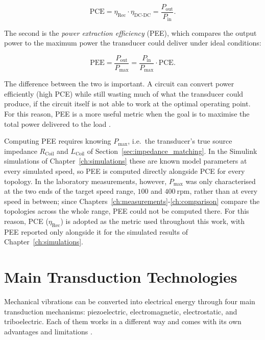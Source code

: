 \begin{equation}
    \text{PCE} = \eta_\text{Rec} \cdot \eta_\text{DC-DC} 
    = \frac{P_\text{out}}{P_\text{in}}.
    \label{eq:pce}
\end{equation}


The second is the \emph{power extraction efficiency} (PEE), 
which compares the output power to the maximum power the 
transducer could deliver under ideal conditions:


\begin{equation}
    \text{PEE} = \frac{P_\text{out}}{P_\text{max}} 
    = \frac{P_\text{in}}{P_\text{max}} \cdot \text{PCE}.
    \label{eq:pee}
\end{equation}


The difference between the two is important. A circuit can 
convert power efficiently (high PCE) while still wasting 
much of what the transducer could produce, if the circuit 
itself is not able to work at the optimal operating 
point. For this reason, PEE is a more useful metric when the
goal is to maximise the total power delivered to the
load \cite{xuSystemImplementationTradeOffs2021}.

Computing PEE requires knowing $P_\text{max}$, i.e.\ the
transducer's true source impedance $R_\text{Coil}$ and
$L_\text{Coil}$ of Section~\ref{sec:impedance_matching}. In
the Simulink simulations of Chapter~\ref{ch:simulations}
these are known model parameters at every simulated speed,
so PEE is computed directly alongside PCE for every
topology. In the laboratory measurements, however,
$P_\text{max}$ was only characterised at the two ends of the
target speed range, $100$ and $400\ \text{rpm}$, rather than
at every speed in between; since
Chapters~\ref{ch:measurements}-\ref{ch:comparison} compare
the topologies across the whole range, PEE could not be
computed there. For this reason, PCE ($\eta_\text{Rec}$) is
adopted as the metric used throughout this work, with PEE
reported only alongside it for the simulated results of
Chapter~\ref{ch:simulations}.



\section{Main Transduction Technologies}

Mechanical vibrations can be converted into electrical 
energy through four main transduction mechanisms: 
piezoelectric, electromagnetic, electrostatic, and 
triboelectric. Each of them works in a different way and 
comes with its own advantages and 
limitations \cite{mitchesonEnergyHarvestingHuman2008, beebyEnergyHarvestingVibration2006}.

